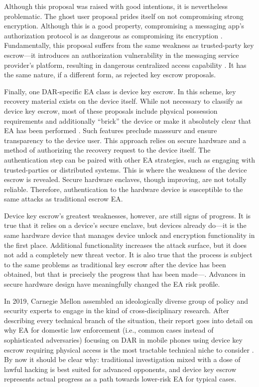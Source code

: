 Although this proposal was raised with good intentions, it is nevertheless problematic. The ghost user proposal prides
itself on not compromising strong encryption. Although this is a good property, compromising a messaging app's
authorization protocol is as dangerous as compromising its encryption \cite{callas_1_2019}. Fundamentally, this proposal
suffers from the same weakness as trusted-party key escrow---it introduces an authorization vulnerability in the
messaging service provider's platform, resulting in dangerous centralized access capability \cite{schneier_ghost_2019}.
It has the same nature, if a different form, as rejected key escrow proposals.

Finally, one \ac{DAR}-specific \ac{EA} class is device key escrow. In this scheme, key recovery material exists on the
device itself. While not necessary to classify as device key escrow, most of these proposals include physical possession
requirements and additionally ``brick'' the device or make it absolutely clear that \ac{EA} has been performed
\cite{savage_lawful_2018} \cite{ozzie_2018}. Such features preclude \ac{masssurv} and ensure transparency to the device
user. This approach relies on secure hardware and a method of authorizing the recovery request to the device itself. The
authentication step can be paired with other \ac{EA} strategies, such as engaging with trusted-parties or distributed
systems. This is where the weakness of the device escrow is revealed. Secure hardware enclaves, though improving, are
not totally reliable. Therefore, authentication to the hardware device is susceptible to the same attacks as traditional
escrow \ac{EA}.

Device key escrow's greatest weaknesses, however, are still signs of progress. It is true that it relies on a device's
secure enclave, but devices already do---it is the same hardware device that manages device unlock and encryption
functionality in the first place. Additional functionality increases the attack surface, but it does not add a
completely new threat vector. It is also true that the process is subject to the same problems as traditional key escrow
after the device has been obtained, but that is precisely the progress that has been made---. Advances in secure hardware design have meaningfully changed the \ac{EA} risk profile.

In 2019, Carnegie Mellon assembled an ideologically diverse group of policy and security experts to engage in the kind
of cross-disciplinary research. After describing every technical branch of the situation, their report goes into detail
on why \ac{EA} for domestic law enforcement (i.e., common cases instead of sophisticated adversaries) focusing on
\ac{DAR} in mobile phones using device key escrow requiring physical access is the most tractable technical niche to
consider \cite{group_2019}. By now it should be clear why: traditional investigation mixed with a dose of lawful hacking
is best suited for advanced opponents, and device key escrow represents actual progress as a path towards lower-risk
\ac{EA} for typical cases.

